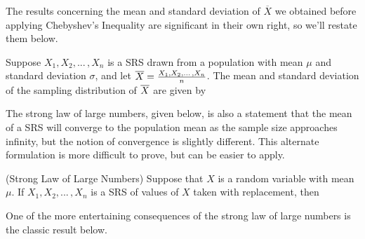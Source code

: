 \par
The results concerning the mean and standard deviation of $\overline{X}$ we obtained before applying Chebyshev's Inequality are significant in their own right, so we'll restate them below.
\begin{cor}\label{StandardErrorOfMean} Suppose $X_1, X_2, ...\, , X_n$ is a SRS drawn from a population with mean $\mu$ and standard deviation $\sigma$, and let ${\overline{X}} = \frac{X_1, X_2, ...\, , X_n}{n}$. The mean and standard deviation of the sampling distribution of ${\overline{X}}$ are given by
\end{cor}
\par
The strong law of large numbers, given below, is also a statement that the mean of a SRS will converge to the population mean as the sample size approaches infinity, but the notion of convergence is slightly different. This alternate formulation is more difficult to prove, but can be easier to apply.

\begin{thm} (Strong Law of Large Numbers) Suppose that $X$ is a random variable with mean $\mu$. If $X_1, X_2, ... \, , X_n$ is a SRS of values of $X$ taken with replacement, then
\end{thm}

\par
One of the more entertaining consequences of the strong law of large numbers is the classic result below.

